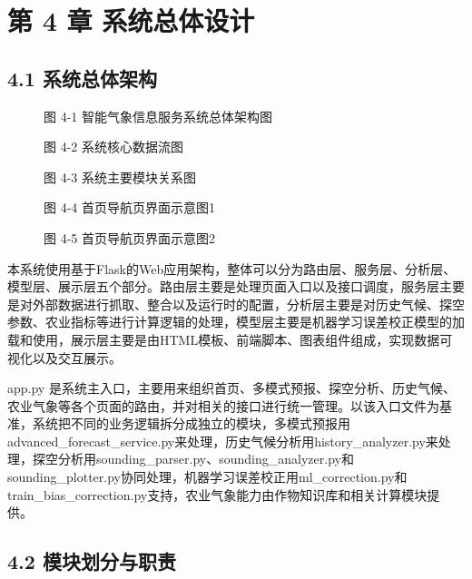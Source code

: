 \section{第 4 章 系统总体设计}

\subsection{4.1 系统总体架构}

\begin{figure}[htbp]
\centering
\caption{图 4-1  智能气象信息服务系统总体架构图}
\label{fig:4-1}
\end{figure}

\begin{figure}[htbp]
\centering
\caption{图 4-2  系统核心数据流图}
\label{fig:4-2}
\end{figure}

\begin{figure}[htbp]
\centering
\caption{图 4-3  系统主要模块关系图}
\label{fig:4-3}
\end{figure}

\begin{figure}[htbp]
\centering
\caption{图 4-4  首页导航页界面示意图1}
\label{fig:4-4}
\end{figure}

\begin{figure}[htbp]
\centering
\caption{图 4-5  首页导航页界面示意图2}
\label{fig:4-5}
\end{figure}

本系统使用基于Flask的Web应用架构，整体可以分为路由层、服务层、分析层、模型层、展示层五个部分。路由层主要是处理页面入口以及接口调度，服务层主要是对外部数据进行抓取、整合以及运行时的配置，分析层主要是对历史气候、探空参数、农业指标等进行计算逻辑的处理，模型层主要是机器学习误差校正模型的加载和使用，展示层主要是由HTML模板、前端脚本、图表组件组成，实现数据可视化以及交互展示。

app.py 是系统主入口，主要用来组织首页、多模式预报、探空分析、历史气候、农业气象等各个页面的路由，并对相关的接口进行统一管理。以该入口文件为基准，系统把不同的业务逻辑拆分成独立的模块，多模式预报用advanced\_forecast\_service.py来处理，历史气候分析用history\_analyzer.py来处理，探空分析用sounding\_parser.py、sounding\_analyzer.py和sounding\_plotter.py协同处理，机器学习误差校正用ml\_correction.py和train\_bias\_correction.py支持，农业气象能力由作物知识库和相关计算模块提供。

\subsection{4.2 模块划分与职责}

